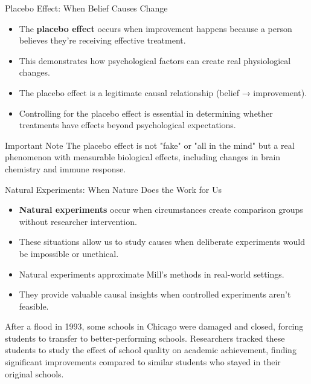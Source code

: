 \documentclass{beamer}
\begin{document}
\begin{frame}{Placebo Effect: When Belief Causes Change}
    \begin{itemize}
        \item The \textbf{placebo effect} occurs when improvement happens because a person believes they're receiving effective treatment.
        \item This demonstrates how psychological factors can create real physiological changes.
        \item The placebo effect is a legitimate causal relationship (belief → improvement).
        \item Controlling for the placebo effect is essential in determining whether treatments have effects beyond psychological expectations.
    \end{itemize}
    
    \begin{alertblock}{Important Note}
        The placebo effect is not "fake" or "all in the mind" but a real phenomenon with measurable biological effects, including changes in brain chemistry and immune response.
    \end{alertblock}
\end{frame}

\begin{frame}{Natural Experiments: When Nature Does the Work for Us}
    \begin{itemize}
        \item \textbf{Natural experiments} occur when circumstances create comparison groups without researcher intervention.
        \item These situations allow us to study causes when deliberate experiments would be impossible or unethical.
        \item Natural experiments approximate Mill's methods in real-world settings.
        \item They provide valuable causal insights when controlled experiments aren't feasible.
    \end{itemize}
    
    \begin{example}
        After a flood in 1993, some schools in Chicago were damaged and closed, forcing students to transfer to better-performing schools. Researchers tracked these students to study the effect of school quality on academic achievement, finding significant improvements compared to similar students who stayed in their original schools.
    \end{example}
\end{frame}
\end{document}
